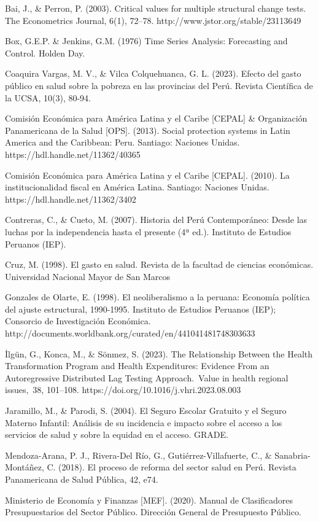 \documentclass[12pt]{article}
\begin{document}
Bai, J., \& Perron, P. (2003). Critical values for multiple structural change tests. The Econometrics Journal, 6(1), 72–78. http://www.jstor.org/stable/23113649

Box, G.E.P. \& Jenkins, G.M. (1976) Time Series Analysis: Forecasting and Control. Holden Day.

Coaquira Vargas, M. V., \& Vilca Colquehuanca, G. L. (2023). Efecto del gasto público en salud sobre la pobreza en las provincias del Perú. Revista Científica de la UCSA, 10(3), 80-94. 

Comisión Económica para América Latina y el Caribe [CEPAL] \& Organización Panamericana de la Salud [OPS]. (2013). Social protection systems in Latin America and the Caribbean: Peru. Santiago: Naciones Unidas. https://hdl.handle.net/11362/40365

Comisión Económica para América Latina y el Caribe [CEPAL]. (2010). La institucionalidad fiscal en América Latina. Santiago: Naciones Unidas. https://hdl.handle.net/11362/3402

Contreras, C., \& Cueto, M. (2007). Historia del Perú Contemporáneo: Desde las luchas por la independencia hasta el presente (4ª ed.). Instituto de Estudios Peruanos (IEP).

Cruz, M. (1998). El gasto en salud. Revista de la facultad de ciencias económicas. Universidad Nacional Mayor de San Marcos 

Gonzales de Olarte, E. (1998). El neoliberalismo a la peruana: Economía política del ajuste estructural, 1990-1995. Instituto de Estudios Peruanos (IEP); Consorcio de Investigación Económica. http://documents.worldbank.org/curated/en/441041481748303633

İlgün, G., Konca, M., \& Sönmez, S. (2023). The Relationship Between the Health Transformation Program and Health Expenditures: Evidence From an Autoregressive Distributed Lag Testing Approach. Value in health regional issues, 38, 101–108. https://doi.org/10.1016/j.vhri.2023.08.003

Jaramillo, M., \& Parodi, S. (2004). El Seguro Escolar Gratuito y el Seguro Materno Infantil: Análisis de su incidencia e impacto sobre el acceso a los servicios de salud y sobre la equidad en el acceso. GRADE. 

Mendoza-Arana, P. J., Rivera-Del Río, G., Gutiérrez-Villafuerte, C., \& Sanabria-Montáñez, C. (2018). El proceso de reforma del sector salud en Perú. Revista Panamericana de Salud Pública, 42, e74. 

Ministerio de Economía y Finanzas [MEF]. (2020). Manual de Clasificadores Presupuestarios del Sector Público. Dirección General de Presupuesto Público.  
\end{document}
